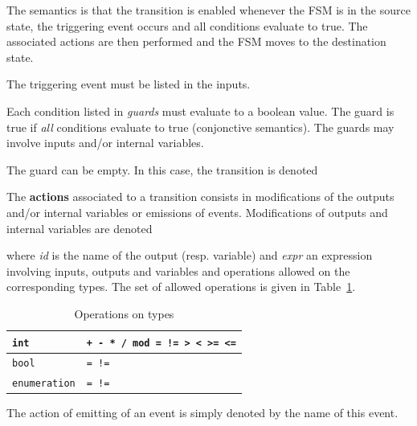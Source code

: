 \medskip The semantics is that the transition is enabled whenever the FSM is in the source state,
the triggering event occurs and all conditions evaluate to true. The associated actions are then
performed and the FSM moves to the destination state.

\medskip
The triggering event must be listed in the inputs.

\medskip
Each condition listed in \emph{guards} must evaluate to a boolean value. The guard is true if
\emph{all} conditions evaluate to true (conjonctive semantics).
The guards may involve inputs and/or internal variables.

\medskip
The guard can be empty. In this case, the transition is denoted
\begin{center}
\end{center}

\medskip The \textbf{actions} associated to a transition consists in modifications of the outputs
and/or internal variables or emissions of events. Modifications of outputs and internal variables
are denoted

\begin{center}
\end{center}

where \emph{id} is the name of the output (resp. variable) and \emph{expr} an expression involving
inputs, outputs and variables and operations allowed on the corresponding types. The set of allowed
operations is given in Table~\ref{tab:type-ops}.

\begin{table}
\begin{minipage}[c]{1.0\linewidth}
\small
\begin{center}
\begin{tabular}{|l|l|} \hline
{\tt int}       & {\tt + - * / mod = != > < >= <=} \\  \hline
{\tt bool}      & {\tt = !=} \\ \hline 
{\tt enumeration}     & {\tt = !=} \\  \hline
\end{tabular}
\caption{Operations on types}
\label{tab:type-ops}
\end{center}
\end{minipage}
\end{table}

\medskip
The action of emitting of an event  is simply denoted by the name of this event.

